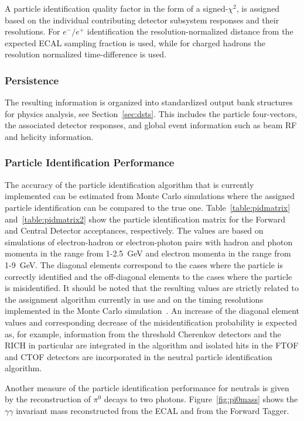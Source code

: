 A particle identification quality factor in the form of a signed-$\chi^2$, is assigned based on the individual
contributing detector subsystem responses and their resolutions. For $e^-/e^+$ identification the
resolution-normalized distance from the expected ECAL sampling fraction is used, while for charged hadrons
the resolution normalized time-difference is used.

\subsubsection{Persistence}

The resulting information is organized into standardized output bank structures for physics analysis, see
Section~\ref{sec:dsts}. This includes the particle four-vectors, the associated detector responses, and global
event information such as beam RF and helicity information.

\subsubsection{Particle Identification Performance}

The accuracy of the particle identification algorithm that is currently implemented can be estimated from
Monte Carlo simulations where the assigned particle identification can be compared to the true one.
Table~\ref{table:pidmatrix} and~\ref{table:pidmatrix2} show the particle identification matrix for the Forward and Central Detector acceptances, respectively.
The values are based on simulations of electron-hadron or electron-photon pairs with hadron and photon momenta
in the range from 1-2.5~GeV and electron momenta in the range from 1-9~GeV. The diagonal elements correspond
to the cases where the particle is correctly identified and the off-diagonal elements to the cases where the
particle is misidentified. It should be noted that the resulting values are strictly related to the assignment
algorithm currently in use and on the timing resolutions implemented in the Monte Carlo simulation~\cite{sim-nim}.
An increase of the diagonal element values and corresponding decrease of the misidentification probability is
expected as, for example, information from the threshold Cherenkov detectors and the RICH in particular are
integrated in the algorithm and isolated hits in the FTOF and CTOF detectors are incorporated in the neutral
particle identification algorithm.

Another measure of the particle identification performance for neutrals is given by the reconstruction of $\pi^0$
decays to two photons. Figure~\ref{fig:pi0mass} shows the $\gamma \gamma$ invariant mass reconstructed from
the ECAL and from the Forward Tagger.

